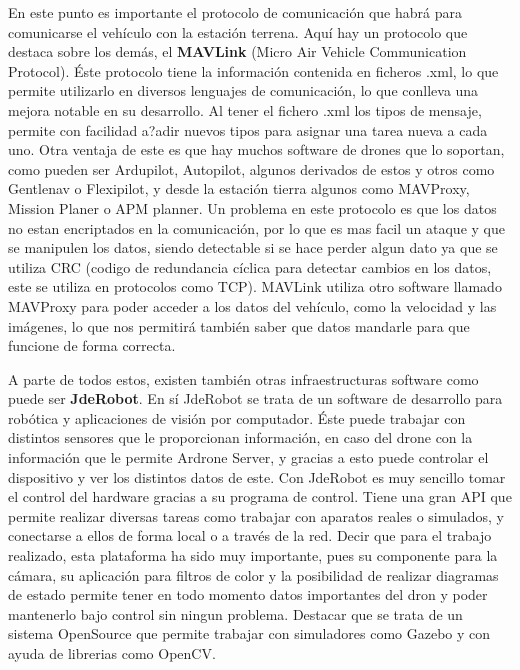 \hspace{1 cm} En este punto es importante el protocolo de comunicaci\'on que habr\'a para comunicarse el veh\'iculo con la estaci\'on terrena. Aqu\'i hay un protocolo que destaca sobre los dem\'as, el \textbf{MAVLink} (Micro Air Vehicle Communication Protocol). \'Este protocolo tiene la informaci\'on contenida en ficheros .xml, lo que permite utilizarlo en diversos lenguajes de comunicaci\'on, lo que conlleva una mejora notable en su desarrollo. Al tener el fichero .xml los tipos de mensaje, permite con facilidad a?adir nuevos tipos para asignar una tarea nueva a cada uno. Otra ventaja de este es que hay muchos software de drones que lo soportan, como pueden ser Ardupilot, Autopilot, algunos derivados de estos y otros como Gentlenav o Flexipilot, y desde la estaci\'on tierra algunos como MAVProxy, Mission Planer o APM planner. 
Un problema en este protocolo es que los datos no estan encriptados en la comunicaci\'on, por lo que es mas facil un ataque y que se manipulen los datos, siendo detectable si se hace perder algun dato ya que se utiliza CRC (codigo de redundancia c\'iclica para detectar cambios en los datos, este se utiliza en protocolos como TCP).
MAVLink utiliza otro software llamado MAVProxy para poder acceder a los datos del veh\'iculo, como la velocidad y las im\'agenes, lo que nos permitir\'a tambi\'en saber que datos mandarle para que funcione de forma correcta. 

\hspace{1 cm} A parte de todos estos, existen tambi\'en otras infraestructuras software como puede ser \textbf{JdeRobot}. En s\'i JdeRobot se trata de un software de desarrollo para rob\'otica y aplicaciones de visi\'on por computador. \'Este puede trabajar con distintos sensores que le proporcionan informaci\'on, en caso del drone con la informaci\'on que le permite Ardrone Server, y gracias a esto puede controlar el dispositivo y ver los distintos datos de este. Con JdeRobot es muy sencillo tomar el control del hardware gracias a su programa de control. Tiene una gran API que permite realizar diversas tareas como trabajar con aparatos reales o simulados, y conectarse a ellos de forma local o a trav\'es de la red. Decir que para el trabajo realizado, esta plataforma ha sido muy importante, pues su componente para la c\'amara, su aplicaci\'on para filtros de color y la posibilidad de realizar diagramas de estado permite tener en todo momento datos importantes del dron y poder mantenerlo bajo control sin ningun problema. Destacar que se trata de un sistema OpenSource que permite trabajar con simuladores como Gazebo y con ayuda de librerias como OpenCV. 
 


